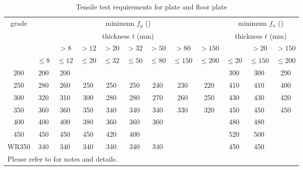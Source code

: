 \begin{table}[H]
\centering\footnotesize
\caption{Tensile test requirements for plate and floor plate}\label{tab:plate}
\begin{tabular}{c|cccccccc|ccc}
	\toprule
	\multirow{3}[0]{*}{grade} &                                         \multicolumn{8}{c|}{minimum $f_y$ (\si{\mpa})}                                         &  \multicolumn{3}{c}{minimum $f_u$ (\si{\mpa})}  \\
	                          &                                         \multicolumn{8}{c|}{thickness $t$ (\si{\mm})}                                          &  \multicolumn{3}{c}{thickness $t$ (\si{\mm})}   \\
	                          &              &     $>8$      &     $>12$     &     $>20$     &     $>32$     &     $>50$     &     $>80$      &     $>150$     &               &     $>20$      &     $>150$     \\
	                          & $\leqslant8$ & $\leqslant12$ & $\leqslant20$ & $\leqslant32$ & $\leqslant50$ & $\leqslant80$ & $\leqslant150$ & $\leqslant200$ & $\leqslant20$ & $\leqslant150$ & $\leqslant200$ \\ \midrule
	           200            &     200      &      200      &               &               &               &               &                &                &      300      &      300       &      290       \\
	           250            &     280      &      260      &      250      &      250      &      250      &      240      &      230       &      220       &      410      &      410       &      400       \\
	           300            &     320      &      310      &      300      &      280      &      280      &      270      &      260       &      250       &      430      &      430       &      420       \\
	           350            &     360      &      360      &      350      &      340      &      340      &      340      &      330       &      320       &      450      &      450       &      450       \\
	           400            &     400      &      400      &      380      &      360      &      360      &      360      &                &                &      480      &      480       &                \\
	           450            &     450      &      450      &      450      &      420      &      400      &               &                &                &      520      &      500       &                \\
	          WR350           &     340      &      340      &      340      &      340      &      340      &      340      &                &                &      450      &      450       &                \\ \bottomrule
	\multicolumn{12}{l}{Please refer to \ASNZSPLATE{Table 8} for notes and details.}
\end{tabular}
\end{table}
